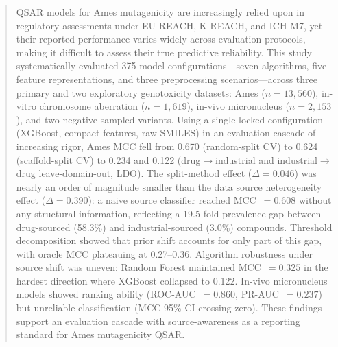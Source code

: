 \begin{abstract}
QSAR models for Ames mutagenicity are increasingly relied upon in regulatory assessments 
under EU REACH, K-REACH, and ICH M7, yet their reported performance varies widely across 
evaluation protocols, making it difficult to assess their true predictive 
reliability.\cite{Honma_2019,Furuhama_2023,Wu_MoleculeNet_2018} This study systematically 
evaluated 375 model configurations---seven algorithms, five feature representations, and 
three preprocessing scenarios---across three primary and two exploratory genotoxicity 
datasets: Ames ($n = 13{,}560$), in-vitro chromosome aberration ($n = 1{,}619$), in-vivo 
micronucleus ($n = 2{,}153$), and two negative-sampled variants. Using a single locked 
configuration (XGBoost, compact features, raw SMILES) in an evaluation cascade of 
increasing rigor, Ames MCC fell from 0.670 (random-split CV) to 0.624 (scaffold-split CV) 
to 0.234 and 0.122 (drug$\to$industrial and industrial$\to$drug leave-domain-out, LDO). 
The split-method effect ($\Delta = 0.046$) was nearly an order of magnitude smaller than 
the data source heterogeneity effect ($\Delta = 0.390$): a naive source classifier reached 
MCC~$= 0.608$ without any structural information, reflecting a 19.5-fold prevalence gap 
between drug-sourced (58.3\%) and industrial-sourced (3.0\%) compounds. Threshold 
decomposition showed that prior shift accounts for only part of this gap, with oracle MCC 
plateauing at 0.27--0.36. Algorithm robustness under source shift was uneven: Random Forest
maintained MCC~$= 0.325$ in the hardest direction where XGBoost collapsed to 0.122. 
In-vivo micronucleus models showed ranking ability (ROC-AUC~$= 0.860$, PR-AUC~$= 0.237$) 
but unreliable classification (MCC 95\% CI crossing zero). These findings support an 
evaluation cascade with source-awareness as a reporting standard for Ames mutagenicity QSAR.
\end{abstract}
